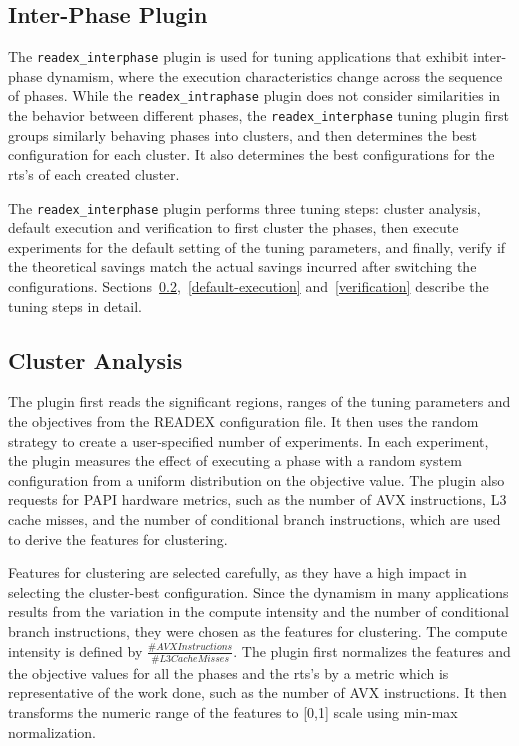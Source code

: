 \subsection{Inter-Phase Plugin} \label{sec:inter-phase}
The \texttt{readex\_interphase} plugin  is used for tuning applications that exhibit inter-phase dynamism, where the execution characteristics change across the sequence of phases. While the \texttt{readex\_intraphase} plugin does not consider similarities in the behavior between different phases, the \texttt{readex\_interphase} tuning plugin first groups similarly behaving phases into clusters, and then determines the best configuration for each cluster. It also determines the best configurations for the rts's of each created cluster.

The \texttt{readex\_interphase} plugin performs three tuning steps: cluster analysis, default execution and verification to first cluster the phases, then execute experiments for the default setting of the tuning parameters, and finally, verify if the theoretical savings match the actual savings incurred after switching the configurations. Sections~\ref{cluster-analysis},~\ref{default-execution} and~\ref{verification} describe the tuning steps in detail.

\subsection{Cluster Analysis} \label{cluster-analysis}
The plugin first reads the significant regions, ranges of the tuning parameters and the objectives from the READEX configuration file. It then uses the random strategy to create a user-specified number of experiments. In each experiment, the plugin measures the effect of executing a phase with a random system configuration from a uniform distribution  on the objective value. The plugin also requests for PAPI hardware metrics, such as the number of AVX instructions, L3 cache misses, and the number of conditional branch instructions, which are used to derive the features for clustering.

Features for clustering are selected carefully, as they have a high impact in selecting the cluster-best configuration. Since the dynamism in many applications results from the variation in the compute intensity and the number of conditional branch instructions, they were chosen as the features for clustering. The compute intensity is defined by $\frac{\#AVX Instructions}{\#L3 Cache Misses}$. The plugin first normalizes the features and the objective values for all the phases and the rts’s by a metric which is representative of the work done, such as the number of AVX instructions. It then transforms the numeric range of the features to [0,1] scale using min-max normalization.

